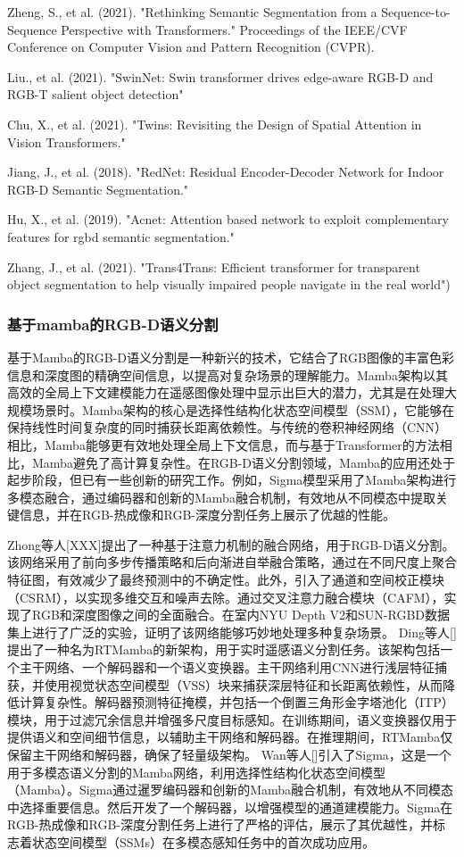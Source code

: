 Zheng, S., et al. (2021). "Rethinking Semantic Segmentation from a Sequence-to-Sequence Perspective with Transformers." Proceedings of the IEEE/CVF Conference on Computer Vision and Pattern Recognition (CVPR).

Liu., et al. (2021). "SwinNet: Swin transformer drives edge-aware RGB-D and RGB-T salient object detection" 

Chu, X., et al. (2021). "Twins: Revisiting the Design of Spatial Attention in Vision Transformers." 

Jiang, J., et al. (2018). "RedNet: Residual Encoder-Decoder Network for Indoor RGB-D Semantic Segmentation."

Hu, X., et al. (2019). "Acnet: Attention based network to exploit complementary features for rgbd semantic segmentation." 

Zhang, J., et al. (2021). "Trans4Trans: Efficient transformer for transparent object segmentation to help visually impaired people navigate in the real world")


\subsubsection{基于mamba的RGB-D语义分割}
基于Mamba的RGB-D语义分割是一种新兴的技术，它结合了RGB图像的丰富色彩信息和深度图的精确空间信息，以提高对复杂场景的理解能力。Mamba架构以其高效的全局上下文建模能力在遥感图像处理中显示出巨大的潜力，尤其是在处理大规模场景时。Mamba架构的核心是选择性结构化状态空间模型（SSM），它能够在保持线性时间复杂度的同时捕获长距离依赖性。与传统的卷积神经网络（CNN）相比，Mamba能够更有效地处理全局上下文信息，而与基于Transformer的方法相比，Mamba避免了高计算复杂性。在RGB-D语义分割领域，Mamba的应用还处于起步阶段，但已有一些创新的研究工作。例如，Sigma模型采用了Mamba架构进行多模态融合，通过编码器和创新的Mamba融合机制，有效地从不同模态中提取关键信息，并在RGB-热成像和RGB-深度分割任务上展示了优越的性能。

Zhong等人[XXX]提出了一种基于注意力机制的融合网络，用于RGB-D语义分割。该网络采用了前向多步传播策略和后向渐进自举融合策略，通过在不同尺度上聚合特征图，有效减少了最终预测中的不确定性。此外，引入了通道和空间校正模块（CSRM），以实现多维交互和噪声去除。通过交叉注意力融合模块（CAFM），实现了RGB和深度图像之间的全面融合。在室内NYU Depth V2和SUN-RGBD数据集上进行了广泛的实验，证明了该网络能够巧妙地处理多种复杂场景。
Ding等人[]提出了一种名为RTMamba的新架构，用于实时遥感语义分割任务。该架构包括一个主干网络、一个解码器和一个语义变换器。主干网络利用CNN进行浅层特征捕获，并使用视觉状态空间模型（VSS）块来捕获深层特征和长距离依赖性，从而降低计算复杂性。解码器预测特征掩模，并包括一个倒置三角形金字塔池化（ITP）模块，用于过滤冗余信息并增强多尺度目标感知。在训练期间，语义变换器仅用于提供语义和空间细节信息，以辅助主干网络和解码器。在推理期间，RTMamba仅保留主干网络和解码器，确保了轻量级架构。
Wan等人[]引入了Sigma，这是一个用于多模态语义分割的Mamba网络，利用选择性结构化状态空间模型（Mamba）。Sigma通过暹罗编码器和创新的Mamba融合机制，有效地从不同模态中选择重要信息。然后开发了一个解码器，以增强模型的通道建模能力。Sigma在RGB-热成像和RGB-深度分割任务上进行了严格的评估，展示了其优越性，并标志着状态空间模型（SSMs）在多模态感知任务中的首次成功应用。


